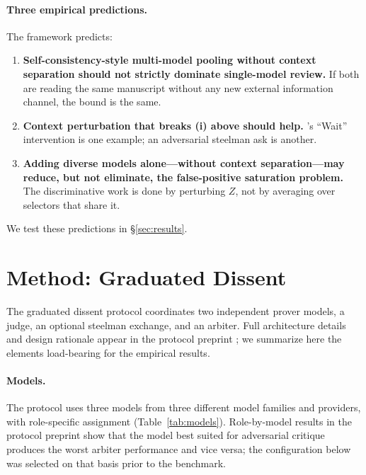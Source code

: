 \documentclass[11pt]{article}
\theoremstyle{definition}
\begin{document}
\paragraph{Three empirical predictions.} The framework predicts:
\begin{enumerate}[label=(P\arabic*), nosep]
\item \textbf{Self-consistency-style multi-model pooling without context separation should not strictly dominate single-model review.} If both are reading the same manuscript without any new external information channel, the bound is the same.
\item \textbf{Context perturbation that breaks (i) above should help.} \citet{tsui2025selfcorrection}'s ``Wait'' intervention is one example; an adversarial steelman ask is another.
\item \textbf{Adding diverse models alone---without context separation---may reduce, but not eliminate, the false-positive saturation problem.} The discriminative work is done by perturbing $Z$, not by averaging over selectors that share it.
\end{enumerate}

We test these predictions in \S\ref{sec:results}.

\section{Method: Graduated Dissent}
\label{sec:method}

The graduated dissent protocol coordinates two independent prover models, a judge, an optional steelman exchange, and an arbiter. Full architecture details and design rationale appear in the protocol preprint \citep{brilliant2026protocol}; we summarize here the elements load-bearing for the empirical results.

\paragraph{Models.} The protocol uses three models from three different model families and providers, with role-specific assignment (Table~\ref{tab:models}). Role-by-model results in the protocol preprint show that the model best suited for adversarial critique produces the worst arbiter performance and vice versa; the configuration below was selected on that basis prior to the benchmark.
\end{document}
